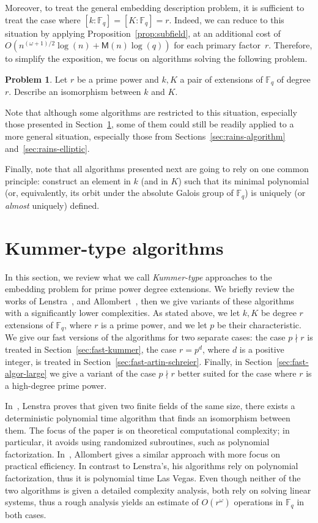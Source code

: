\documentclass[12pt]{article}
\theoremstyle{plain}
\theoremstyle{definition}
\newtheorem*{problem}{Problem}
\def\F{\ensuremath{\mathbb{F}}}
\def\MM{\ensuremath{\mathsf{M}}}
\newcounter{algorithm}
\begin{document}
Moreover, to treat the general embedding description problem,
it is sufficient to treat the case where $[k:\F_q]=[K:\F_q]=r$.
Indeed, we can reduce to this situation by applying
Proposition~\ref{prop:subfield}, at an additional cost of
$O(n^{(\omega+1)/2}\log(n) + \MM(n)\log(q))$ for each primary factor~$r$.
Therefore, to simplify the exposition, we focus on algorithms
solving the following problem.
\begin{problem}
\label{prob:embedding}
Let $r$ be a prime power and $k, K$ a pair of extensions of $\F_q$
of degree $r$.
Describe an isomorphism between $k$ and $K$.
\end{problem}
Note that although some algorithms are restricted to this situation,
especially those presented in Section~\ref{sec:kummer},
some of them could still be readily applied to a more general situation,
especially those from Sections~\ref{sec:rains-algorithm}
and~\ref{sec:rains-elliptic}.

Finally, note that
all algorithms presented next are going to rely on one common
principle: construct an element in $k$ (and in $K$) such that its
minimal polynomial (or, equivalently, its orbit under the absolute
Galois group of $\F_q$) is uniquely (or \emph{almost} uniquely)
defined.

\section{Kummer-type algorithms}
\label{sec:kummer}

In this section, we review what we call \emph{Kummer-type} approaches to the embedding problem for prime power degree extensions. 
We briefly review the works of Lenstra~\cite{LenstraJr91},
and Allombert~\cite{Allombert02,Allombert02-rev}, then 
we give variants of these algorithms with a significantly lower complexities.
As stated above, we let $k, K$ be degree $r$ extensions of $\F_q$,
where $r$ is a prime power,
and we let $p$ be their characteristic.
We give our fast versions of the algorithms for two separate cases: the case $p \nmid r$
is treated in Section~\ref{sec:fast-kummer}, the case $r = p^d$, where $d$ 
is a positive integer, is treated in Section~\ref{sec:fast-artin-schreier}.
Finally, in Section~\ref{sec:fast-algor-large} we give a variant of the case
$p \nmid r$ better suited for the case where $r$ is a high-degree prime power.

In~\cite{LenstraJr91}, Lenstra proves that 
given two finite fields of the same size, there exists a deterministic polynomial time algorithm 
that finds an isomorphism between them.
The focus of the paper is on theoretical computational complexity;
in particular, it avoids using randomized subroutines, such as polynomial
factorization. 
In~\cite{Allombert02,Allombert02-rev}, Allombert gives a similar approach with more focus on practical efficiency.
In contrast to Lenstra's, his algorithms rely on polynomial factorization, thus it is
polynomial time Las Vegas.
Even though neither of the two algorithms is given a detailed complexity analysis, both rely
on solving linear systems, thus a rough analysis yields an estimate of $O(r^{\omega})$ operations
in $\F_q$ in both cases.
\end{document}

